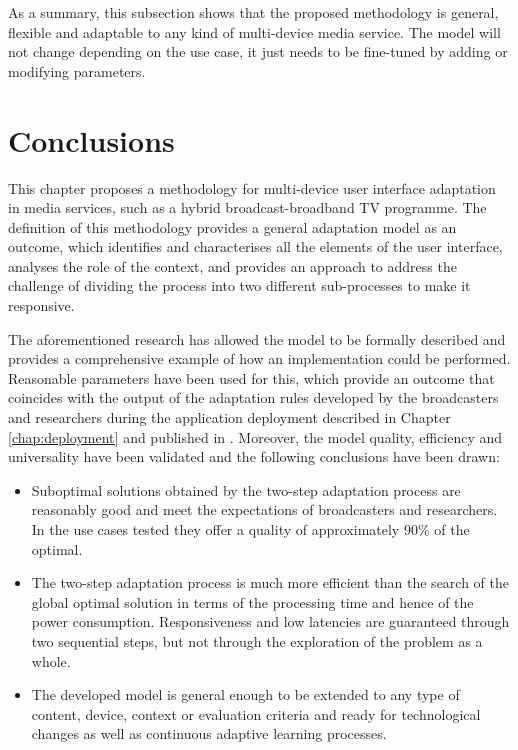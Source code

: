 As a summary, this subsection shows that the proposed methodology is general, flexible and adaptable to any kind of multi-device media service. The model will not change depending on the use case, it just needs to be fine-tuned by adding or modifying parameters.

\section{Conclusions}
This chapter proposes a methodology for multi-device user interface adaptation in media services, such as a hybrid broadcast-broadband TV programme. The definition of this methodology provides a general adaptation model as an outcome, which identifies and characterises all the elements of the user interface, analyses the role of the context, and provides an approach to address the challenge of dividing the process into two different sub-processes to make it responsive.

The aforementioned research has allowed the model to be formally described and provides a comprehensive example of how an implementation could be performed. Reasonable parameters have been used for this, which provide an outcome that coincides with the output of the adaptation rules developed by the broadcasters and researchers during the application deployment described in Chapter \ref{chap:deployment} and published in \cite{dominguez2017deployment}. Moreover, the model quality, efficiency and universality have been validated and the following conclusions have been drawn:
\begin{itemize}
	\item Suboptimal solutions obtained by the two-step adaptation process are reasonably good and meet the expectations of broadcasters and researchers. In the use cases tested  they offer a quality of approximately 90\% of the optimal. 
	\item The two-step adaptation process is much more efficient than the search of the global optimal solution in terms of the processing time and hence of the power consumption.
	Responsiveness and low latencies are guaranteed through two sequential steps, but not through the exploration of the problem as a whole.
	\item  The developed model is general enough to be extended to any type of content, device, context or evaluation criteria and ready for technological changes as well as continuous adaptive learning processes. 
\end{itemize}